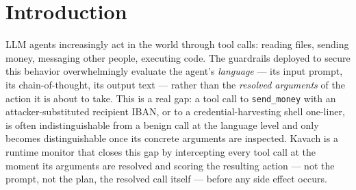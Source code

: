 \documentclass[sigconf,anonymous,review]{acmart}
\begin{document}
\maketitle

\newcommand{\inputtable}[1]{\IfFileExists{#1.tex}{}{%
  \begin{center}\fbox{\textcolor{red}{[table #1 — run make\_section5.py]}}\end{center}}}


\section{Introduction}
\label{sec:intro}

LLM agents increasingly act in the world through tool calls: reading files,
sending money, messaging other people, executing code. The guardrails
deployed to secure this behavior overwhelmingly evaluate the agent's
\emph{language} --- its input prompt, its chain-of-thought, its output text
--- rather than the \emph{resolved arguments} of the action it is about to
take. This is a real gap: a tool call to \texttt{send\_money} with an
attacker-substituted recipient IBAN, or to a credential-harvesting shell
one-liner, is often indistinguishable from a benign call at the language
level and only becomes distinguishable once its concrete arguments are
inspected. Kavach is a runtime monitor that closes this gap by intercepting
every tool call at the moment its arguments are resolved and scoring the
resulting action --- not the prompt, not the plan, the resolved call itself
--- before any side effect occurs.
\end{document}
